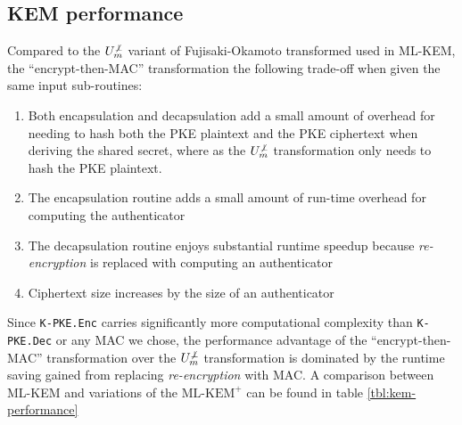\documentclass[journal=tches,submission]{iacrtrans}
\newcommand{\encrypt}{\texttt{Enc}}
\newcommand{\decrypt}{\texttt{Dec}}
\begin{document}
\subsection{KEM performance}
Compared to the $U^{\not\bot}_m$ variant of Fujisaki-Okamoto transformed used in ML-KEM, the ``encrypt-then-MAC'' transformation the following trade-off when given the same input sub-routines: \begin{enumerate}
    \item Both encapsulation and decapsulation add a small amount of overhead for needing to hash both the PKE plaintext and the PKE ciphertext when deriving the shared secret, where as the $U^{\not\bot}_m$ transformation only needs to hash the PKE plaintext.
    \item The encapsulation routine adds a small amount of run-time overhead for computing the authenticator
    \item The decapsulation routine enjoys substantial runtime speedup because \emph{re-encryption} is replaced with computing an authenticator
    \item Ciphertext size increases by the size of an authenticator
\end{enumerate}

Since \texttt{K-PKE.\encrypt} carries significantly more computational complexity than \texttt{K-PKE.\decrypt} or any MAC we chose, the performance advantage of the ``encrypt-then-MAC'' transformation over the $U^{\not\bot}_m$ transformation is dominated by the runtime saving gained from replacing \emph{re-encryption} with MAC. A comparison between ML-KEM and variations of the $\text{ML-KEM}^+$ can be found in table \ref{tbl:kem-performance}
\end{document}
